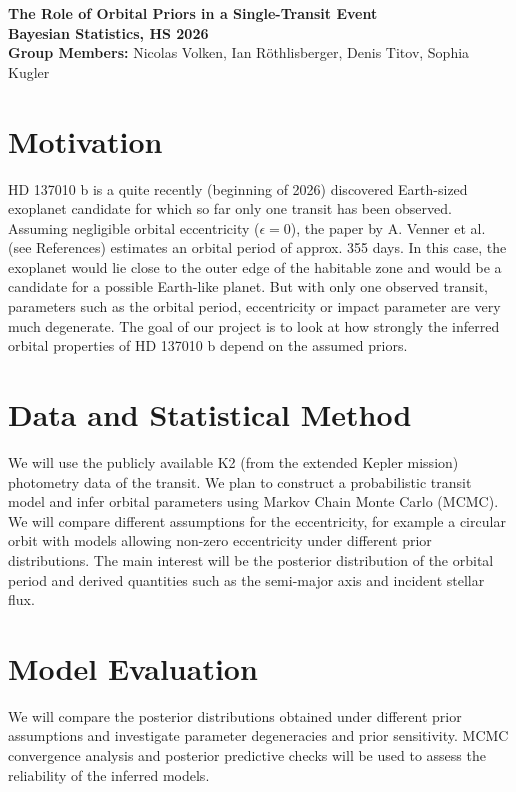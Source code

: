 \documentclass[11pt]{article}
\begin{document}
\begin{center}

{\Large \textbf{The Role of Orbital Priors in a Single-Transit Event}}\\[0.15cm]


\textbf{Bayesian Statistics, HS 2026}\\[0.2cm]

\textbf{Group Members:} Nicolas Volken, Ian Röthlisberger, Denis Titov, Sophia Kugler

\end{center}

\section*{Motivation}

HD 137010 b is a quite recently (beginning of 2026) discovered Earth-sized exoplanet candidate for which so far only one transit has been observed. Assuming negligible orbital eccentricity ($\epsilon = 0$), the paper by A. Venner et al. (see References) estimates an orbital period of approx. 355 days. In this case, the exoplanet would lie close to the outer edge of the habitable zone and would be a candidate for a possible Earth-like planet. But with only one observed transit, parameters such as the orbital period, eccentricity or impact parameter are very much degenerate.
The goal of our project is to look at how strongly the inferred orbital properties of HD 137010 b depend on the assumed priors.

\section*{Data and Statistical Method}
We will use the publicly available K2 (from the extended Kepler mission) photometry data of the transit.
We plan to construct a probabilistic transit model and infer orbital parameters using Markov Chain Monte Carlo (MCMC). We will compare different assumptions for the eccentricity, for example a circular orbit with models allowing non-zero eccentricity under different prior distributions.
The main interest will be the posterior distribution of the orbital period and derived quantities such as the semi-major axis and incident stellar flux.


\section*{Model Evaluation}

We will compare the posterior distributions obtained under different prior assumptions and investigate parameter degeneracies and prior sensitivity. MCMC convergence analysis and posterior predictive checks will be used to assess the reliability of the inferred models.
\end{document}
